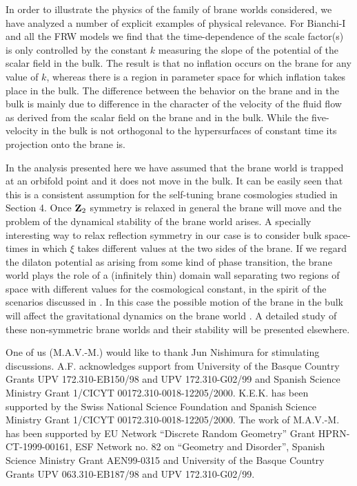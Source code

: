 \documentclass[prd,a4paper,twocolumn,superscriptaddress,nofootinbib,showpacs]{revtex4}
\begin{document}
In order to illustrate the physics of the family of brane worlds considered, we have analyzed a 
number of explicit examples of physical relevance. For Bianchi-I and all the FRW models we find
that the time-dependence of the scale factor(s) is only controlled by the constant $k$ measuring the 
slope of the potential of the scalar field in the bulk. The result is that no inflation occurs 
on the brane for any value of $k$, whereas there is a region in parameter space for which
inflation takes place in the bulk. The difference between the behavior on the brane and in the
bulk is mainly due to difference in the character of the velocity of the fluid flow as 
derived from the scalar field on the brane and in the bulk. While the
five-velocity in the bulk is not orthogonal to the hypersurfaces of constant time 
its projection onto the brane is.

In the analysis presented here we have assumed that the brane world is trapped at an orbifold point and it does not 
move in the bulk. It can be easily seen that this is a consistent assumption for the self-tuning brane cosmologies
studied in Section 4. Once ${\bf Z}_{2}$ symmetry is relaxed in general the brane will move and
the problem of the dynamical stability of the brane world arises. A specially interesting way
to relax reflection symmetry in our case is to consider bulk space-times in which $\xi$ takes different
values at the two sides of the brane. If we regard the dilaton potential as arising from some 
kind of phase transition, the brane world plays the role of a (infinitely thin) domain wall separating 
two regions of space with different values for the cosmological constant, in the spirit 
of the scenarios discussed in \cite{bu}. In this case the possible motion of the brane in the bulk 
will affect the gravitational dynamics on the brane world \cite{krauss,stw}. A detailed study
of these non-symmetric brane worlds and their stability will be presented elsewhere.


\begin{acknowledgments}

One of us (M.A.V.-M.) would like to thank Jun Nishimura for stimulating discussions.  
A.F. acknowledges support from University of the Basque Country Grants UPV 172.310-EB150/98 and
UPV 172.310-G02/99 and Spanish Science Ministry Grant 1/CICYT 00172.310-0018-12205/2000. K.E.K. 
has been supported by the Swiss National Science Foundation and Spanish Science Ministry Grant 
1/CICYT 00172.310-0018-12205/2000. The work of M.A.V.-M. has been
supported by EU Network ``Discrete Random Geometry'' Grant HPRN-CT-1999-00161, ESF Network no. 82
on ``Geometry and Disorder'', Spanish Science Ministry Grant AEN99-0315 and 
University of the Basque Country Grants UPV 063.310-EB187/98 and UPV 172.310-G02/99.

\end{acknowledgments}
\end{document}
